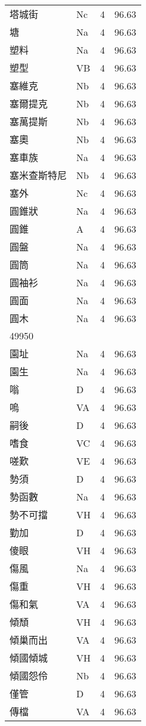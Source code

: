 \documentclass[twocolumn]{book}
\begin{document}
\begin{supertabular}{llrr}
塔城街 & Nc & 4 &  96.63\\
塘 & Na & 4 &  96.63\\
塑料 & Na & 4 &  96.63\\
塑型 & VB & 4 &  96.63\\
塞維克 & Nb & 4 &  96.63\\
塞爾提克 & Nb & 4 &  96.63\\
塞萬提斯 & Nb & 4 &  96.63\\
塞奧 & Nb & 4 &  96.63\\
塞車族 & Na & 4 &  96.63\\
塞米查斯特尼 & Nb & 4 &  96.63\\
塞外 & Nc & 4 &  96.63\\
圓錐狀 & Na & 4 &  96.63\\
圓錐 & A & 4 &  96.63\\
圓盤 & Na & 4 &  96.63\\
圓筒 & Na & 4 &  96.63\\
圓袖衫 & Na & 4 &  96.63\\
圓面 & Na & 4 &  96.63\\
圓木 & Na & 4 &  96.63\\
49950\\
園址 & Na & 4 &  96.63\\
園生 & Na & 4 &  96.63\\
嗡 & D & 4 &  96.63\\
嗚 & VA & 4 &  96.63\\
嗣後 & D & 4 &  96.63\\
嗜食 & VC & 4 &  96.63\\
嗟歎 & VE & 4 &  96.63\\
勢須 & D & 4 &  96.63\\
勢函數 & Na & 4 &  96.63\\
勢不可擋 & VH & 4 &  96.63\\
勤加 & D & 4 &  96.63\\
傻眼 & VH & 4 &  96.63\\
傷風 & Na & 4 &  96.63\\
傷重 & VH & 4 &  96.63\\
傷和氣 & VA & 4 &  96.63\\
傾頹 & VH & 4 &  96.63\\
傾巢而出 & VA & 4 &  96.63\\
傾國傾城 & VH & 4 &  96.63\\
傾國怨伶 & Nb & 4 &  96.63\\
僅管 & D & 4 &  96.63\\
傳檔 & VA & 4 &  96.63\\

\end{supertabular}
\end{document}
